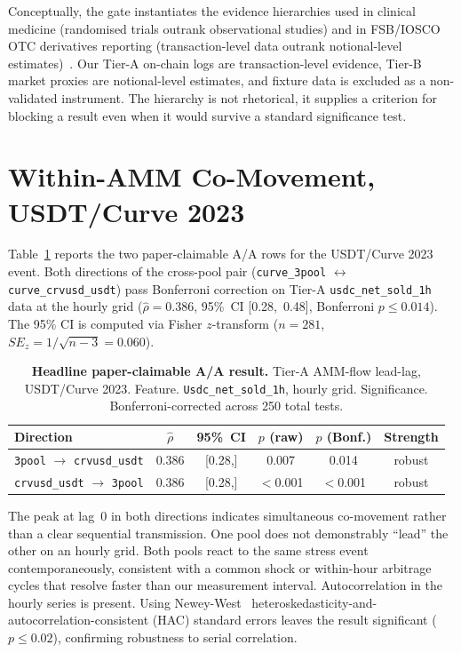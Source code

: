 \documentclass[sigconf,anonymous]{acmart}
\begin{document}
Conceptually, the gate instantiates the evidence hierarchies used in clinical
medicine (randomised trials outrank observational studies) and in FSB/IOSCO OTC
derivatives reporting (transaction-level data outrank notional-level
estimates)~\cite{FSB2023}. Our Tier-A on-chain logs are transaction-level
evidence, Tier-B market proxies are notional-level estimates, and fixture data
is excluded as a non-validated instrument.  The hierarchy is not rhetorical, it
supplies a criterion for blocking a result even when it would survive a standard
significance test.

\section{Within-AMM Co-Movement, USDT/Curve 2023}
\label{sec:main}

Table~\ref{tab:headline} reports the two paper-claimable A/A rows for the
USDT/Curve 2023 event.  Both directions of the cross-pool pair
(\texttt{curve\_3pool} $\leftrightarrow$ \texttt{curve\_crvusd\_usdt})
pass Bonferroni correction on Tier-A \texttt{usdc\_net\_sold\_1h} data at the
hourly grid ($\hat{\rho}=0.386$, 95\%~CI [0.28,~0.48],
Bonferroni $p\le0.014$).  The 95\% CI is computed via Fisher $z$-transform
($n=281$, $SE_z = 1/\sqrt{n-3} = 0.060$).

\begin{table}[!t]
\centering
\caption{\textbf{Headline paper-claimable A/A result.}
  Tier-A AMM-flow lead-lag, USDT/Curve 2023.
  Feature. \texttt{Usdc\_net\_sold\_1h}, hourly grid.
  Significance. Bonferroni-corrected across 250 total tests.}
\label{tab:headline}
\small
\setlength{\tabcolsep}{8pt}
\begin{tabular}{lccccc}
\toprule
Direction & $\hat{\rho}$ & 95\%~CI & $p$ (raw) & $p$ (Bonf.) & Strength \\
\midrule
\texttt{3pool} $\to$ \texttt{crvusd\_usdt} & 0.386 & [0.28,\;0.48] & 0.007 & 0.014 & robust \\
\texttt{crvusd\_usdt} $\to$ \texttt{3pool} & 0.386 & [0.28,\;0.48] & $<$0.001 & $<$0.001 & robust \\
\bottomrule
\end{tabular}
\end{table}



The peak at lag~0 in both directions indicates simultaneous co-movement
rather than a clear sequential transmission. One pool does not demonstrably
``lead'' the other on an hourly grid.  Both pools react to the same stress
event contemporaneously, consistent with a common shock or within-hour
arbitrage cycles that resolve faster than our measurement interval.
Autocorrelation in the hourly series is present. Using Newey-West~\cite{Newey1987}
heteroskedasticity-and-autocorrelation-consistent (HAC) standard errors leaves
the result significant ($p\le0.02$), confirming robustness to serial correlation.
\end{document}
